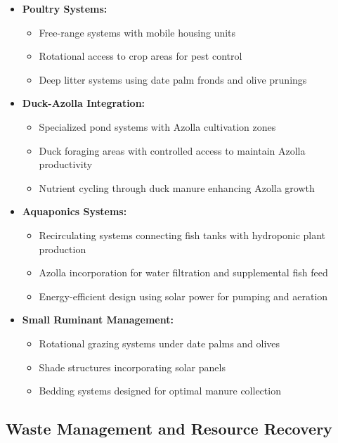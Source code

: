 \begin{itemize}
    \item \textbf{Poultry Systems:}
    \begin{itemize}
        \item Free-range systems with mobile housing units
        \item Rotational access to crop areas for pest control
        \item Deep litter systems using date palm fronds and olive prunings
    \end{itemize}
    
    \item \textbf{Duck-Azolla Integration:}
    \begin{itemize}
        \item Specialized pond systems with Azolla cultivation zones
        \item Duck foraging areas with controlled access to maintain Azolla productivity
        \item Nutrient cycling through duck manure enhancing Azolla growth
    \end{itemize}
    
    \item \textbf{Aquaponics Systems:}
    \begin{itemize}
        \item Recirculating systems connecting fish tanks with hydroponic plant production
        \item Azolla incorporation for water filtration and supplemental fish feed
        \item Energy-efficient design using solar power for pumping and aeration
    \end{itemize}
    
    \item \textbf{Small Ruminant Management:}
    \begin{itemize}
        \item Rotational grazing systems under date palms and olives
        \item Shade structures incorporating solar panels
        \item Bedding systems designed for optimal manure collection
    \end{itemize}
\end{itemize}

\subsection{Waste Management and Resource Recovery}

